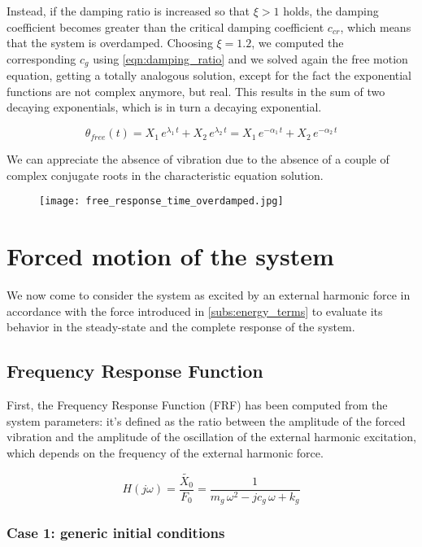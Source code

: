 \documentclass[a4paper,12pt,oneside]{article}
\begin{document}
Instead, if the damping ratio is increased so that $ \xi > 1 $ holds, the damping coefficient becomes greater than the critical damping coefficient $ c_{cr} $, which means that the system is overdamped. Choosing $ \xi = 1.2 $, we computed the corresponding $ c_g $ using \eqref{eqn:damping_ratio} and we solved again the free motion equation, getting a totally analogous solution, except for the fact the exponential functions are not complex anymore, but real. This results in the sum of two decaying exponentials, which is in turn a decaying exponential.

\[
	\theta_{free}(t) = X_1 \, e^{\lambda_1 \, t} + X_2 \, e^{\lambda_2 \, t} = %
		X_1 \, e^{-\alpha_1 \, t} + X_2 \, e^{-\alpha_2 \, t}
\]

We can appreciate the absence of vibration due to the absence of a couple of complex conjugate roots in the characteristic equation solution.

\vspace{16pt}

\begin{figure}
	\centering
	\texttt{[image: free\_response\_time\_overdamped.jpg]}
\end{figure}


\section{Forced motion of the system}

We now come to consider the system as excited by an external harmonic force in accordance with the force introduced in \ref{subs:energy_terms} to evaluate its behavior in the steady-state and the complete response of the system.

\subsection{Frequency Response Function}

First, the Frequency Response Function (FRF) has been computed from the system parameters: it's defined as the ratio between the amplitude of the forced vibration and the amplitude of the oscillation of the external harmonic excitation, which depends on the frequency of the external harmonic force.

\[
	H(j\omega) = \frac{\tilde{X_0}}{F_0} = %
		\frac{1}{m_g \, \omega^2 - j c_g \, \omega + k_g}
\]

\subsubsection*{Case 1: generic initial conditions}
\end{document}
